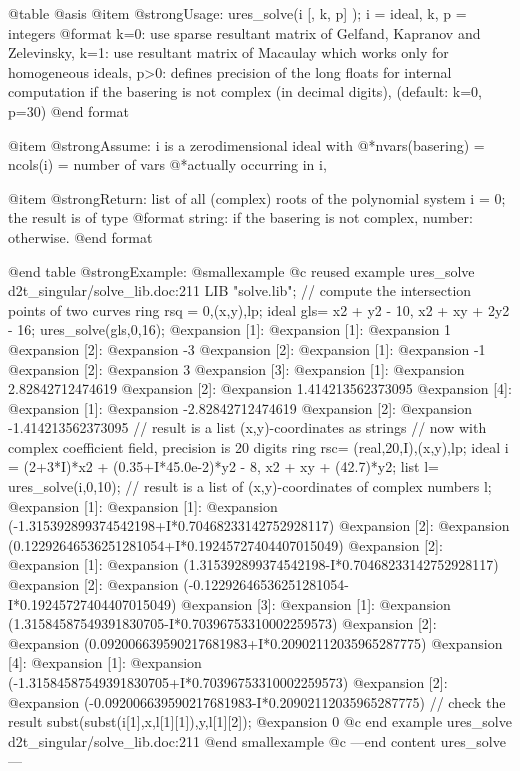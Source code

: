 @table @asis
@item @strong{Usage:}
ures_solve(i [, k, p] ); i = ideal, k, p = integers
@format
   k=0: use sparse resultant matrix of Gelfand, Kapranov and Zelevinsky,
   k=1: use resultant matrix of Macaulay which works only for
          homogeneous ideals,
   p>0: defines precision of the long floats for internal computation
          if the basering is not complex (in decimal digits),
   (default: k=0, p=30)
@end format

@item @strong{Assume:}
i is a zerodimensional ideal with
@*nvars(basering) = ncols(i) = number of vars
@*actually occurring in i,

@item @strong{Return:}
list of all (complex) roots of the polynomial system i = 0; the
result is of type
@format
   string: if the basering is not complex,
   number: otherwise.
@end format

@end table
@strong{Example:}
@smallexample
@c reused example ures_solve d2t_singular/solve_lib.doc:211 
LIB "solve.lib";
// compute the intersection points of two curves
ring rsq = 0,(x,y),lp;
ideal gls=  x2 + y2 - 10, x2 + xy + 2y2 - 16;
ures_solve(gls,0,16);
@expansion{} [1]:
@expansion{}    [1]:
@expansion{}       1
@expansion{}    [2]:
@expansion{}       -3
@expansion{} [2]:
@expansion{}    [1]:
@expansion{}       -1
@expansion{}    [2]:
@expansion{}       3
@expansion{} [3]:
@expansion{}    [1]:
@expansion{}       2.82842712474619
@expansion{}    [2]:
@expansion{}       1.414213562373095
@expansion{} [4]:
@expansion{}    [1]:
@expansion{}       -2.82842712474619
@expansion{}    [2]:
@expansion{}       -1.414213562373095
// result is a list (x,y)-coordinates as strings
// now with complex coefficient field, precision is 20 digits
ring rsc= (real,20,I),(x,y),lp;
ideal i = (2+3*I)*x2 + (0.35+I*45.0e-2)*y2 - 8, x2 + xy + (42.7)*y2;
list l= ures_solve(i,0,10);
// result is a list of (x,y)-coordinates of complex numbers
l;
@expansion{} [1]:
@expansion{}    [1]:
@expansion{}       (-1.315392899374542198+I*0.70468233142752928117)
@expansion{}    [2]:
@expansion{}       (0.12292646536251281054+I*0.19245727404407015049)
@expansion{} [2]:
@expansion{}    [1]:
@expansion{}       (1.315392899374542198-I*0.70468233142752928117)
@expansion{}    [2]:
@expansion{}       (-0.12292646536251281054-I*0.19245727404407015049)
@expansion{} [3]:
@expansion{}    [1]:
@expansion{}       (1.31584587549391830705-I*0.70396753310002259573)
@expansion{}    [2]:
@expansion{}       (0.092006639590217681983+I*0.20902112035965287775)
@expansion{} [4]:
@expansion{}    [1]:
@expansion{}       (-1.31584587549391830705+I*0.70396753310002259573)
@expansion{}    [2]:
@expansion{}       (-0.092006639590217681983-I*0.20902112035965287775)
// check the result
subst(subst(i[1],x,l[1][1]),y,l[1][2]);
@expansion{} 0
@c end example ures_solve d2t_singular/solve_lib.doc:211
@end smallexample
@c ---end content ures_solve---


